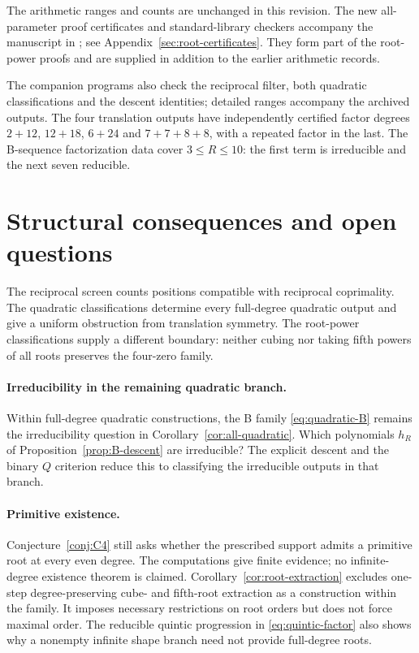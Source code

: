 \documentclass[11pt]{article}
\theoremstyle{definition}
\theoremstyle{remark}
\begin{document}
The arithmetic ranges and counts are unchanged in this revision.
The new all-parameter proof certificates and standard-library checkers
accompany the manuscript in ; see
Appendix~\ref{sec:root-certificates}. They form part of the
root-power proofs and are supplied in addition to the earlier
arithmetic records.

The companion programs also check the reciprocal filter, both quadratic
classifications and the descent identities; detailed ranges accompany
the archived outputs.
The four translation outputs have independently certified factor degrees
$2+12$, $12+18$, $6+24$ and $7+7+8+8$, with a repeated factor in the last.
The B-sequence factorization data cover $3\le R\le10$:
the first term is irreducible and the next seven reducible.

\section{Structural consequences and open questions}\label{sec:limits}
The reciprocal screen counts positions compatible with reciprocal
coprimality. The quadratic classifications determine every full-degree
quadratic output and give a uniform obstruction from translation
symmetry. The root-power classifications supply a different boundary:
neither cubing nor taking fifth powers of all roots preserves the
four-zero family.

\paragraph{Irreducibility in the remaining quadratic branch.}
Within full-degree quadratic constructions, the B family
\eqref{eq:quadratic-B} remains the irreducibility question in
Corollary~\ref{cor:all-quadratic}. Which polynomials $h_R$ of
Proposition~\ref{prop:B-descent} are irreducible?
The explicit descent and the binary $Q$ criterion reduce this
to classifying the irreducible outputs in that branch.

\paragraph{Primitive existence.}
Conjecture~\ref{conj:C4} still asks whether the prescribed support
admits a primitive root at every even degree. The computations
give finite evidence; no infinite-degree existence theorem is
claimed. Corollary~\ref{cor:root-extraction} excludes one-step
degree-preserving cube- and fifth-root extraction as a construction
within the family. It imposes necessary restrictions on root orders
but does not force maximal order.
The reducible quintic progression in
\eqref{eq:quintic-factor} also shows why a nonempty infinite shape
branch need not provide full-degree roots.
\end{document}
